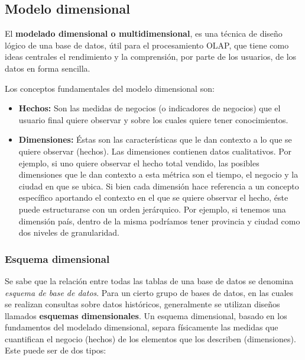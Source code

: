 \documentclass[a4paper,11pt]{article}
\begin{document}
    
    \subsection{Modelo dimensional} \label{mod_dimensional}
    
    El \textbf{modelado dimensional o multidimensional}, es una técnica de diseño lógico de una base de datos, útil para el procesamiento OLAP, que tiene
    como ideas centrales el rendimiento y la comprensión, por parte de los usuarios, de los datos en forma sencilla.
    
    Los conceptos fundamentales del modelo dimensional son:
    
    \begin{itemize}
      \item \textbf{Hechos:} Son las medidas de negocios (o indicadores de negocios) que el usuario final quiere observar y sobre los cuales quiere tener
      conocimientos.
      \item \textbf{Dimensiones:} Éstas son las características que le dan contexto a lo que se quiere observar (hechos).
      Las dimensiones contienen datos cualitativos. Por ejemplo, si uno quiere observar el hecho total 
      vendido, las posibles dimensiones que le dan contexto a esta métrica son el tiempo, el negocio y la ciudad en que se ubica. Si bien cada dimensión hace
      referencia a un concepto específico aportando el contexto en el que se quiere observar el hecho, éste puede estructurarse con un orden jerárquico.
      Por ejemplo, si tenemos una dimensión país, dentro de la misma podríamos tener provincia y ciudad como dos niveles de granularidad. 
    \end{itemize}
    
    \subsubsection{Esquema dimensional}
    
    Se sabe que la relación entre todas las tablas de una base de datos se denomina \textit{esquema de base de datos}. Para un cierto grupo de bases de datos, en las
    cuales se realizan consultas sobre datos históricos, generalmente se utilizan diseños llamados \textbf{esquemas dimensionales}. Un esquema dimensional,
    basado en los fundamentos del modelado dimensional, separa físicamente las medidas que cuantifican el negocio (hechos) de los elementos que los describen
    (dimensiones). Este puede ser de dos tipos:
    
\end{document}
